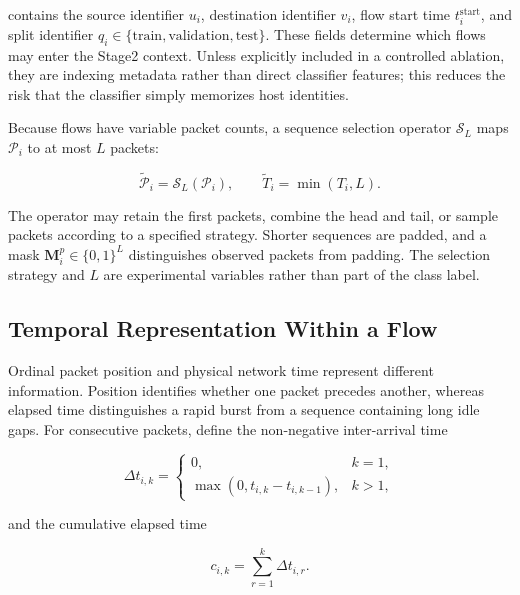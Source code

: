 contains the source identifier $u_i$, destination identifier $v_i$, flow start
time $t_i^{\mathrm{start}}$, and split identifier $q_i\in
\{\mathrm{train},\mathrm{validation},\mathrm{test}\}$. These fields determine
which flows may enter the Stage2 context. Unless explicitly included in a
controlled ablation, they are indexing metadata rather than direct classifier
features; this reduces the risk that the classifier simply memorizes host
identities.

Because flows have variable packet counts, a sequence selection operator
$\mathcal{S}_{L}$ maps $\mathcal{P}_i$ to at most $L$ packets:

\begin{equation}
\widetilde{\mathcal{P}}_i
=
\mathcal{S}_{L}(\mathcal{P}_i),
\qquad
\widetilde{T}_i=\min(T_i,L).
\label{eq:sequence_selection}
\end{equation}

The operator may retain the first packets, combine the head and tail, or sample
packets according to a specified strategy. Shorter sequences are padded, and a
mask $\mathbf{M}_i^{p}\in\{0,1\}^{L}$ distinguishes observed packets from
padding. The selection strategy and $L$ are experimental variables rather than
part of the class label.

\subsection{Temporal Representation Within a Flow}
\label{subsec:pf_time}

Ordinal packet position and physical network time represent different
information. Position identifies whether one packet precedes another, whereas
elapsed time distinguishes a rapid burst from a sequence containing long idle
gaps. For consecutive packets, define the non-negative inter-arrival time

\begin{equation}
\Delta t_{i,k}
=
\begin{cases}
0, & k=1,\\
\max\left(0,t_{i,k}-t_{i,k-1}\right), & k>1,
\end{cases}
\label{eq:packet_iat}
\end{equation}

and the cumulative elapsed time

\begin{equation}
c_{i,k}=\sum_{r=1}^{k}\Delta t_{i,r}.
\label{eq:cumulative_time}
\end{equation}

